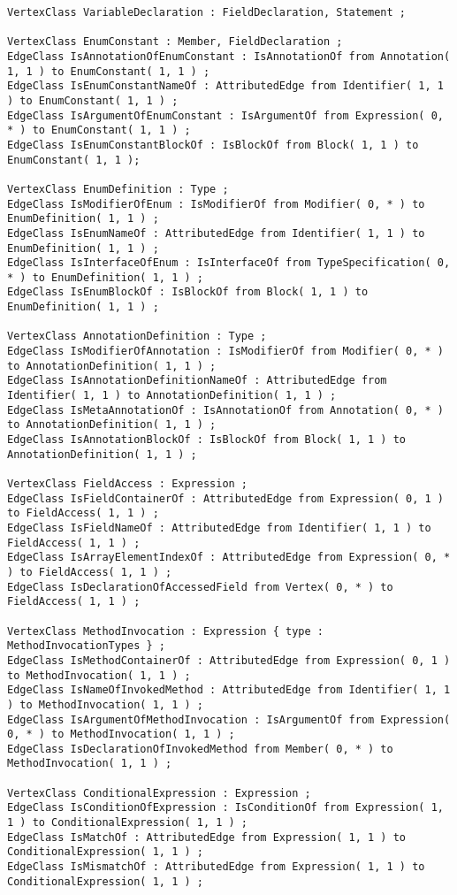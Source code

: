 \begin{lstlisting}[caption=Das im Javaextraktor eingesetzte Schema, label=schema_complete, captionpos=b, style=tgschema]
VertexClass VariableDeclaration : FieldDeclaration, Statement ;

VertexClass EnumConstant : Member, FieldDeclaration ;
EdgeClass IsAnnotationOfEnumConstant : IsAnnotationOf from Annotation( 1, 1 ) to EnumConstant( 1, 1 ) ;
EdgeClass IsEnumConstantNameOf : AttributedEdge from Identifier( 1, 1 ) to EnumConstant( 1, 1 ) ;
EdgeClass IsArgumentOfEnumConstant : IsArgumentOf from Expression( 0, * ) to EnumConstant( 1, 1 ) ;
EdgeClass IsEnumConstantBlockOf : IsBlockOf from Block( 1, 1 ) to EnumConstant( 1, 1 );

VertexClass EnumDefinition : Type ;
EdgeClass IsModifierOfEnum : IsModifierOf from Modifier( 0, * ) to EnumDefinition( 1, 1 ) ;
EdgeClass IsEnumNameOf : AttributedEdge from Identifier( 1, 1 ) to EnumDefinition( 1, 1 ) ;
EdgeClass IsInterfaceOfEnum : IsInterfaceOf from TypeSpecification( 0, * ) to EnumDefinition( 1, 1 ) ;
EdgeClass IsEnumBlockOf : IsBlockOf from Block( 1, 1 ) to EnumDefinition( 1, 1 ) ;

VertexClass AnnotationDefinition : Type ;
EdgeClass IsModifierOfAnnotation : IsModifierOf from Modifier( 0, * ) to AnnotationDefinition( 1, 1 ) ;
EdgeClass IsAnnotationDefinitionNameOf : AttributedEdge from Identifier( 1, 1 ) to AnnotationDefinition( 1, 1 ) ;
EdgeClass IsMetaAnnotationOf : IsAnnotationOf from Annotation( 0, * ) to AnnotationDefinition( 1, 1 ) ;
EdgeClass IsAnnotationBlockOf : IsBlockOf from Block( 1, 1 ) to AnnotationDefinition( 1, 1 ) ;

VertexClass FieldAccess : Expression ;
EdgeClass IsFieldContainerOf : AttributedEdge from Expression( 0, 1 ) to FieldAccess( 1, 1 ) ;
EdgeClass IsFieldNameOf : AttributedEdge from Identifier( 1, 1 ) to FieldAccess( 1, 1 ) ;
EdgeClass IsArrayElementIndexOf : AttributedEdge from Expression( 0, * ) to FieldAccess( 1, 1 ) ;
EdgeClass IsDeclarationOfAccessedField from Vertex( 0, * ) to FieldAccess( 1, 1 ) ;

VertexClass MethodInvocation : Expression { type : MethodInvocationTypes } ;
EdgeClass IsMethodContainerOf : AttributedEdge from Expression( 0, 1 ) to MethodInvocation( 1, 1 ) ;
EdgeClass IsNameOfInvokedMethod : AttributedEdge from Identifier( 1, 1 ) to MethodInvocation( 1, 1 ) ; 
EdgeClass IsArgumentOfMethodInvocation : IsArgumentOf from Expression( 0, * ) to MethodInvocation( 1, 1 ) ;
EdgeClass IsDeclarationOfInvokedMethod from Member( 0, * ) to MethodInvocation( 1, 1 ) ;

VertexClass ConditionalExpression : Expression ;
EdgeClass IsConditionOfExpression : IsConditionOf from Expression( 1, 1 ) to ConditionalExpression( 1, 1 ) ;
EdgeClass IsMatchOf : AttributedEdge from Expression( 1, 1 ) to ConditionalExpression( 1, 1 ) ;
EdgeClass IsMismatchOf : AttributedEdge from Expression( 1, 1 ) to ConditionalExpression( 1, 1 ) ;


\end{lstlisting}
